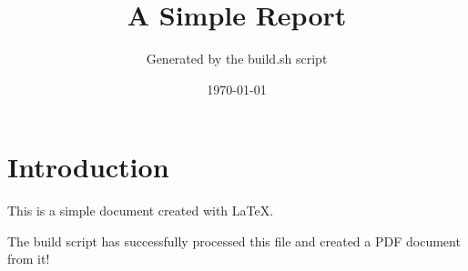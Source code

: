 \documentclass{article}s
\title{A Simple Report}
\author{Generated by the build.sh script}
\date{\today}
\begin{document}
\maketitle

\section{Introduction}

This is a simple document created with LaTeX.

The build script has successfully processed this file and created a PDF document from it!
\end{document}
